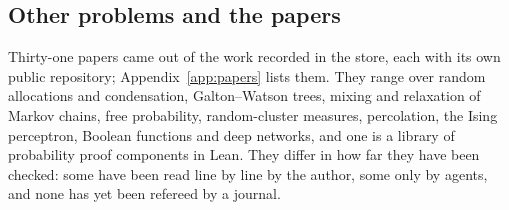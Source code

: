 \subsection{Other problems and the papers}
Thirty-one papers came out of the work recorded in the store, each with its own public repository; Appendix~\ref{app:papers} lists them. They range over random allocations and condensation, Galton--Watson trees, mixing and relaxation of Markov chains, free probability, random-cluster measures, percolation, the Ising perceptron, Boolean functions and deep networks, and one is a library of probability proof components in Lean. They differ in how far they have been checked: some have been read line by line by the author, some only by agents, and none has yet been refereed by a journal.
